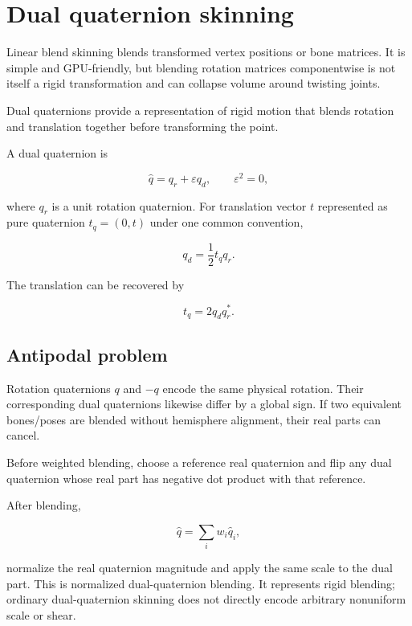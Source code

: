 \hypertarget{appendix-921f3f2efb53}{}\label{referencestart:appendix-921f3f2efb53}
\section{Dual quaternion skinning}\label{appendix-921f3f2efb53-dual-quaternion-skinning}

\hypertarget{appendix-921f3f2efb53-dual-quaternion-skinning}{}

Linear blend skinning blends transformed vertex positions or bone matrices. It is simple and GPU-friendly, but blending rotation matrices componentwise is not itself a rigid transformation and can collapse volume around twisting joints.

Dual quaternions provide a representation of rigid motion that blends rotation and translation together before transforming the point.

A dual quaternion is

\[
\hat q=q_r+\varepsilon q_d,
\qquad \varepsilon^2=0,
\]

where \(q_r\) is a unit rotation quaternion. For translation vector \(t\) represented as pure quaternion \(t_q=(0,t)\) under one common convention,

\[
q_d=\frac12 t_q q_r.
\]

The translation can be recovered by

\[
t_q=2q_dq_r^*.
\]

\subsection{Antipodal problem}\label{appendix-921f3f2efb53-antipodal-problem}

\hypertarget{appendix-921f3f2efb53-antipodal-problem}{}

Rotation quaternions \(q\) and \(-q\) encode the same physical rotation. Their corresponding dual quaternions likewise differ by a global sign. If two equivalent bones/poses are blended without hemisphere alignment, their real parts can cancel.

Before weighted blending, choose a reference real quaternion and flip any dual quaternion whose real part has negative dot product with that reference.

After blending,

\[
\hat q = \sum_i w_i \hat q_i,
\]

normalize the real quaternion magnitude and apply the same scale to the dual part. This is normalized dual-quaternion blending. It represents rigid blending; ordinary dual-quaternion skinning does not directly encode arbitrary nonuniform scale or shear.


